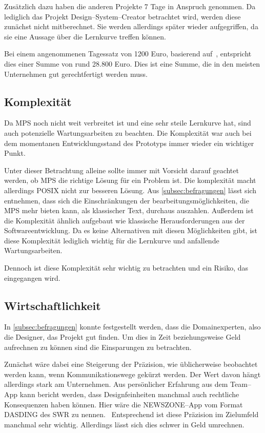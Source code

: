 Zusätzlich dazu haben die anderen Projekte 7 Tage in Anspruch genommen.
Da lediglich das Projekt Design--System--Creator betrachtet wird, werden diese zunächst nicht mitberechnet.
Sie werden allerdings später wieder aufgegriffen, da sie eine Aussage über die Lernkurve treffen können.

Bei einem angenommenen Tagessatz von 1200 Euro, basierend auf~\cite{metrics-germany-gmbh-2021}, entspricht dies einer Summe von rund 28.800 Euro.
Dies ist eine Summe, die in den meisten Unternehmen gut gerechtfertigt werden muss.

\subsection{Komplexität}\label{subsec:komplexitat}
Da \ac{MPS} noch nicht weit verbreitet ist und eine sehr steile Lernkurve hat, sind auch potenzielle Wartungsarbeiten zu beachten.
Die Komplexität war auch bei dem momentanen Entwicklungsstand des Prototyps immer wieder ein wichtiger Punkt.

Unter dieser Betrachtung alleine sollte immer mit Vorsicht darauf geachtet werden, ob \ac{MPS} die richtige Lösung für ein Problem ist.
Die komplexität macht allerdings \ac{POSIX} nicht zur besseren Lösung.
Aus \autoref{subsec:befragungen} lässt sich entnehmen, dass sich die Einschränkungen der bearbeitungsmöglichkeiten, die \ac{MPS} mehr bieten kann, als klassischer Text, durchaus auszahlen.
Außerdem ist die Komplexität ähnlich aufgebaut wie klassische Herausforderungen aus der Softwareentwicklung.
Da es keine Alternativen mit diesen Möglichkeiten gibt, ist diese Komplexität lediglich wichtig für die Lernkurve und anfallende Wartungsarbeiten.

Dennoch ist diese Komplexität sehr wichtig zu betrachten und ein Risiko, das eingegangen wird.

\subsection{Wirtschaftlichkeit}\label{subsec:wirtschaftlichkeit}
In \autoref{subsec:befragungen} konnte festgestellt werden, dass die Domainexperten, also die Designer, das Projekt gut finden.
Um dies in Zeit beziehungsweise Geld aufrechnen zu können sind die Einsparungen zu betrachten.

Zunächst wäre dabei eine Steigerung der Präzision, wie üblicherweise beobachtet werden kann, wenn Kommunikationswege gekürzt werden.
Der Wert davon hängt allerdings stark am Unternehmen.
Aus persönlicher Erfahrung aus dem Team--App kann bericht werden, dass Designfeinheiten manchmal auch rechtliche Konsequenzen haben können.
Hier wäre die NEWSZONE--App vom Format DASDING des \ac{SWR} zu nennen.~\autocite{suddeutsche-zeitung-2022}
Entsprechend ist diese Präzision im Zielumfeld manchmal sehr wichtig.
Allerdings lässt sich dies schwer in Geld umrechnen.

